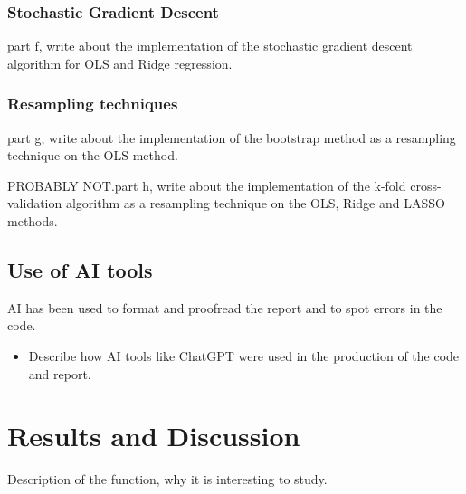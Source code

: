 \documentclass[amssymb,twocolumn,aps]{revtex4}
\begin{document}
\subsubsection*{Stochastic Gradient Descent}
part f, write about the implementation of the stochastic gradient descent algorithm for OLS and Ridge regression.

\subsubsection{Resampling techniques}
part g, write about the implementation of the bootstrap method as a resampling technique on the OLS method.

PROBABLY NOT.part h, write about the implementation of the k-fold cross-validation algorithm as a resampling technique on the OLS, Ridge and LASSO methods.

\subsection{Use of AI tools}
	AI has been used to format and proofread the report and to spot errors in the code.
\begin{itemize}
    \item Describe how AI tools like ChatGPT were used in the production of the code and report.
\end{itemize}




\section{Results and Discussion}\label{section:results}

Description of the function, why it is interesting to study.
\end{document}
